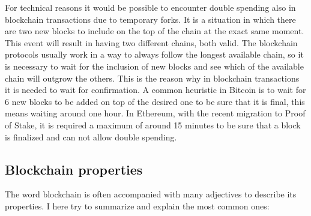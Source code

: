 For technical reasons it would be possible to encounter double spending also in blockchain transactions due to temporary forks. It is a situation in which there are two new blocks to include on the top of the chain at the exact same moment. This event will result in having two different chains, both valid. The blockchain protocols usually work in a way to always follow the longest available chain, so it is necessary to wait for the inclusion of new blocks and see which of the available chain will outgrow the others. This is the reason why in blockchain transactions it is needed to wait for confirmation. A common heuristic in Bitcoin is to wait for 6 new blocks to be added on top of the desired one to be sure that it is final, this means waiting around one hour. In Ethereum, with the recent migration to Proof of Stake, it is required a maximum of around 15 minutes to be sure that a block is finalized and can not allow double spending.

\subsection{Blockchain properties}

The word blockchain is often accompanied with many adjectives to describe its properties. I here try to summarize and explain the most common ones:

